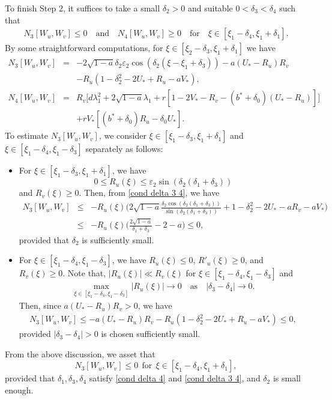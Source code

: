 \documentclass[11pt,a4paper]{article}
\numberwithin{equation}{section}
\numberwithin{figure}{section}
\newcommand\bea{\begin{eqnarray}}
\newcommand\eea{\end{eqnarray}}
\newcommand\beaa{\begin{eqnarray*}}
\newcommand\eeaa{\end{eqnarray*}}
\begin{document}
To finish Step 2, it suffices to take a small $\delta_2>0$ and suitable $0<\delta_3<\delta_4$ such that
\bea\label{goal: step 3}
N_3[W_u,W_v]\leq 0\quad\text{and}\quad N_4[W_u,W_v]\geq 0\quad \mbox{for}\quad \xi\in[\xi_1-\delta_4,\xi_1+\delta_1].
\eea
By some  straightforward computations, for $\xi\in[\xi_2-\delta_3,\xi_1+\delta_1]$ we have
\beaa
N_3[W_u,W_v]&=&-2\sqrt{1-a}\delta_2\varepsilon_2\cos(\delta_2(\xi-\xi_1+\delta_3))-a(U_*-R_u)R_v\\
&&-R_u(1-\delta_2^2-2U_*+R_u-aV_*),\\
N_4[W_u,W_v]&=&R_v\Big[d\lambda_1^2+2\sqrt{1-a}\lambda_1+r[1-2V_*-R_v-(b^*+\delta_0)(U_*-R_u)]\Big]
            \\&&+rV_*[(b^*+\delta_0)R_u-\delta_0U_*].
\eeaa
To estimate $N_3[W_u,W_v]$,
we consider $\xi\in[\xi_1-\delta_3,\xi_1+\delta_1]$ and $\xi\in[\xi_1-\delta_4,\xi_1-\delta_3]$ separately as follows:
\begin{itemize}
\item For $\xi\in[\xi_1-\delta_3,\xi_1+\delta_1]$, we have
$$0\le R_u(\xi)\le \varepsilon_2\sin(\delta_2(\delta_1+\delta_3))$$
 and $R_v(\xi)\geq0$.
Then, from \eqref{cond delta 3 4},  we have
\beaa
N_3[W_u,W_v]&\leq& -R_u({\xi})\Big(2\sqrt{1-a}\frac{\delta_2\cos(\delta_2(\delta_1+\delta_3))}{\sin(\delta_2(\delta_1+\delta_3))}+1-\delta_2^2-2U_*-aR_v-aV_*\Big)\\
&\le & -R_u({\xi})\Big(\frac{2\sqrt{1-a}}{\delta_1+\delta_3}-2-a\Big)\leq 0,
\eeaa
provided that $\delta_2$ is sufficiently small.

\item For $\xi\in[\xi_1-\delta_4,\xi_1-\delta_3]$, we have $R_u(\xi)\leq 0$, $R'_u(\xi)\geq 0$, and $R_v(\xi)\ge 0$.
Note that, $|R_u(\xi)|\ll R_v(\xi)$ for $\xi\in[\xi_1-\delta_4,\xi_1-\delta_3]$ and
\bea\label{delta3-4 to 0}
\max_{\xi\in[\xi_1-\delta_4,\xi_1-\delta_3]}|R_u(\xi)|\to 0\quad\text{as}\quad|\delta_3-\delta_4|\to 0.
\eea
Then, since $a(U_*-R_u)R_v> 0$, we have
\beaa
N_3[W_u,W_v]\leq -a(U_*-R_u)R_v-R_u(1-\delta_2^2-2U_*+R_u-aV_*)\leq 0,
\eeaa
provided $|\delta_3-\delta_4|>0$ is chosen sufficiently small.
\end{itemize}
From the above discussion, we asset that 
$$N_3[W_u,W_v]\leq 0\ \ \text{for}\ \ \xi\in[\xi_1-\delta_4,\xi_1+\delta_1],$$
provided that $\delta_1, \delta_3, \delta_4$ satisfy \eqref{cond delta 4} and \eqref{cond delta 3 4}, and
$\delta_2$ is small enough.
\end{document}
